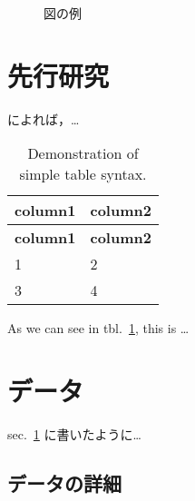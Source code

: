 \documentclass[
  12pt,
  titlepage,
  draft]{ltjsarticle}
\begin{document}
\begin{figure}
\centering
{}
\caption{図の例}
\end{figure}

\hypertarget{sec:previous_research}{%
\section{先行研究}\label{sec:previous_research}}

\lipsum[1-4]

\autocite{benjamin_reconstructing_2012,hodoscek_readability_2012,dubay_smart_2007,pitler_revisiting_2008,sato_automatic_2008,Sato2008}

\textcite{shibasaki_japanese_2010} によれば，\ldots{}

\hypertarget{tbl:my_table}{}
\begin{longtable}[]{@{}ll@{}}
\caption{\label{tbl:my_table}Demonstration of simple table
syntax.}\tabularnewline
\toprule()
\textbf{column1} & \textbf{column2} \\
\midrule()
\endfirsthead
\toprule()
\textbf{column1} & \textbf{column2} \\
\midrule()
\endhead
1 & 2 \\
3 & 4 \\
\bottomrule()
\end{longtable}

As we can see in tbl.~\ref{tbl:my_table}, this is \ldots{}

\hypertarget{ux30c7ux30fcux30bf}{%
\section{データ}\label{ux30c7ux30fcux30bf}}

sec.~\ref{sec:previous_research} に書いたように\ldots{}

\lipsum[1-4]

\hypertarget{ux30c7ux30fcux30bfux306eux8a73ux7d30}{%
\subsection{データの詳細}\label{ux30c7ux30fcux30bfux306eux8a73ux7d30}}
\end{document}
